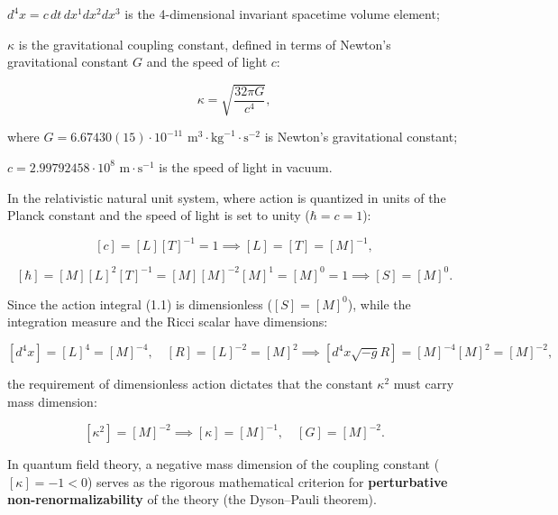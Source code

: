 \documentclass[11pt,a4paper]{article}
\theoremstyle{definition}
\begin{document}
$d^4x = c \, dt \, dx^1 dx^2 dx^3$ is the 4-dimensional invariant spacetime volume element;  

$\kappa$ is the gravitational coupling constant, defined in terms of Newton's gravitational constant $G$ and the speed of light $c$:

\begin{equation}\label{eq:1.2}\tag{1.2}
\kappa = \sqrt{\frac{32\pi G}{c^4}},
\end{equation}

where $G = 6.67430(15) \cdot 10^{-11}\text{ m}^3\cdot\text{kg}^{-1}\cdot\text{s}^{-2}$ is Newton's gravitational constant;  

$c = 2.99792458 \cdot 10^8\text{ m}\cdot\text{s}^{-1}$ is the speed of light in vacuum.

In the relativistic natural unit system, where action is quantized in units of the Planck constant and the speed of light is set to unity ($\hbar = c = 1$):

\begin{equation}\label{eq:1.4}\tag{1.4}
[c] = [L][T]^{-1} = 1 \implies [L] = [T] = [M]^{-1},
\end{equation}

\begin{equation}\label{eq:1.5}\tag{1.5}
[\hbar] = [M][L]^2[T]^{-1} = [M][M]^{-2}[M]^1 = [M]^0 = 1 \implies [S] = [M]^0.
\end{equation}

Since the action integral (1.1) is dimensionless ($[S] = [M]^0$), while the integration measure and the Ricci scalar have dimensions:

\begin{equation}\label{eq:1.6}\tag{1.6}
[d^4x] = [L]^4 = [M]^{-4}, \quad [R] = [L]^{-2} = [M]^2 \implies [d^4x \sqrt{-g} R] = [M]^{-4} [M]^2 = [M]^{-2},
\end{equation}

the requirement of dimensionless action dictates that the constant $\kappa^2$ must carry mass dimension:

\begin{equation}\label{eq:1.7}\tag{1.7}
[\kappa^2] = [M]^{-2} \implies [\kappa] = [M]^{-1}, \quad [G] = [M]^{-2}.
\end{equation}

In quantum field theory, a negative mass dimension of the coupling constant ($[\kappa] = -1 < 0$) serves as the rigorous mathematical criterion for \textbf{perturbative non-renormalizability} of the theory (the Dyson--Pauli theorem).
\end{document}
